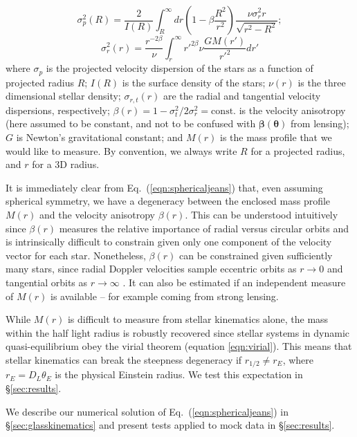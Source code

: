 \documentclass[galley,usenatbib]{mn2e}
\renewcommand{\vec}[1]{\ensuremath{\boldsymbol{#1}}}
\newcommand{\Mddd}{\ensuremath{M}}
\newcommand{\eqnref}[1] {Eq.~(\ref{#1})}
\newcommand{\secref}[1] {\S\ref{#1}}
\begin{document}
\begin{equation}
\sigma_p^2(R) = \frac{2}{I(R)}\int_R^\infty dr \left(1-\beta \frac{R^2}{r^2}\right) \frac{\nu \sigma_r^2 r}{\sqrt{r^2 - R^2}};
\label{eqn:sphericaljeans}
\end{equation}
%
\begin{equation} 
\sigma_r^2(r) = \frac{r^{-2\beta}}{\nu}\int_r^\infty r'^{2\beta} \nu \frac{G\Mddd(r')}{r'^2}dr'
\end{equation} 
%
where $\sigma_p$ is the projected velocity dispersion of the stars as a
function of projected radius $R$; $I(R)$ is the surface density of the stars;
$\nu(r)$ is the three dimensional stellar density; $\sigma_{r,t}(r)$ are the
radial and tangential velocity dispersions, respectively; $\beta(r) = 1 -
\sigma_t^2/2\sigma_r^2 = \mathrm{const.}$ is the velocity anisotropy (here
assumed to be constant, and not to be confused with $\vec\beta(\vec\theta)$
from lensing); $G$ is Newton's gravitational constant; and $\Mddd(r)$ is the
mass profile that we would like to measure. By convention, we always write $R$
for a projected radius, and $r$ for a 3D radius.

It is immediately clear from \eqnref{eqn:sphericaljeans} that, even assuming
spherical symmetry, we have a degeneracy between the enclosed mass profile
$\Mddd(r)$ and the velocity anisotropy $\beta(r)$. This can be understood
intuitively since $\beta(r)$ measures the relative importance of radial versus
circular orbits and is intrinsically difficult to constrain given only one
component of the velocity vector for each star. Nonetheless, $\beta(r)$ can be
constrained given sufficiently many stars, since radial Doppler velocities
sample eccentric orbits as $r\rightarrow 0$ and tangential orbits as
$r\rightarrow \infty$ \citep[e.g.][]{2002MNRAS.330..778W}. It can also be
estimated if an independent measure of $\Mddd(r)$ is available -- for example
coming from strong lensing. 

While $\Mddd(r)$ is difficult to measure from stellar kinematics alone, the
mass within the half light radius is robustly recovered
\citep[e.g.][]{2009ApJ...704.1274W,2010MNRAS.406.1220W,2012ApJ...754L..39A}
since stellar systems in dynamic quasi-equilibrium obey the virial theorem
(equation \ref{eqn:virial}). This means that stellar kinematics can break the
steepness degeneracy if $r_{1/2} \neq r_E$, where $r_E = D_L \theta_E$ is the
physical Einstein radius. We test this expectation in \secref{sec:results}.

We describe our numerical solution of \eqnref{eqn:sphericaljeans} in
\secref{sec:glasskinematics} and present tests applied to mock data in
\secref{sec:results}. 
\end{document}
